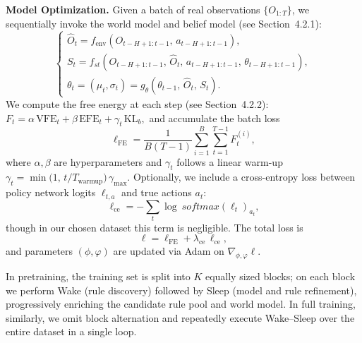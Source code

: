\textbf{Model Optimization.} Given a batch of real observations $\{O_{1:T}\}$, we sequentially invoke the world model and belief model (see Section~4.2.1):
\[
\begin{cases}
\hat{O}_{t} = f_{\mathrm{env}}(O_{t-H+1:t-1},\,a_{t-H+1:t-1}),\\
S_{t} = f_{st}(O_{t-H+1:t-1},\,\hat{O}_{t},\,a_{t-H+1:t-1},\,\theta_{t-H+1:t-1}),\\
\theta_{t} = (\mu_{t},\sigma_{t}) = g_{\theta}(\theta_{t-1},\,\hat{O}_{t},\,S_{t}).
\end{cases}
\]
We compute the free energy at each step (see Section~4.2.2):$F_{t} = \alpha\,\mathrm{VFE}_{t} + \beta\,\mathrm{EFE}_{t} + \gamma_{t}\,\mathrm{KL}_{b},$
and accumulate the batch loss
\[
\ell_{\mathrm{FE}} = \frac{1}{B(T-1)}\sum_{i=1}^{B}\sum_{t=1}^{T-1}F_{t}^{(i)},
\]
where $\alpha,\beta$ are hyperparameters and $\gamma_{t}$ follows a linear warm-up $\gamma_{t} = \min\bigl(1,\,t/T_{\mathrm{warmup}}\bigr)\,\gamma_{\max}.$
Optionally, we include a cross-entropy loss between policy network logits $\ell_{t,a}$ and true actions $a_{t}$:
\[
\ell_{\mathrm{ce}} = -\sum_{t}\log\ softmax(\ell_{t})_{a_{t}},
\]
though in our chosen dataset this term is negligible. The total loss is
\[
\ell = \ell_{\mathrm{FE}} + \lambda_{\mathrm{ce}}\,\ell_{\mathrm{ce}},
\]
and parameters $(\phi,\varphi)$ are updated via Adam on $\nabla_{\phi,\varphi}\ell$.



In pretraining, the training set is split into $K$ equally sized blocks; on each block we perform Wake (rule discovery) followed by Sleep (model and rule refinement), progressively enriching the candidate rule pool and world model. In full training, similarly, we omit block alternation and repeatedly execute Wake–Sleep over the entire dataset in a single loop.